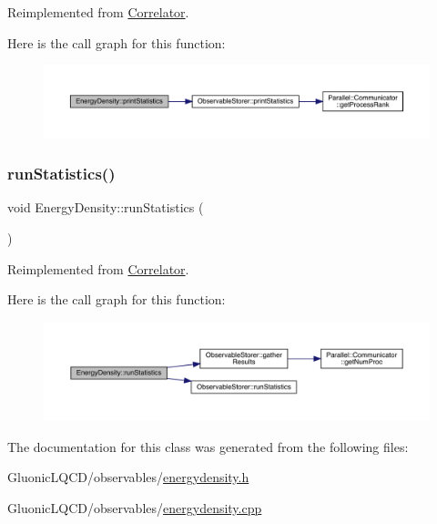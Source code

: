 Reimplemented from \mbox{\hyperlink{class_correlator_a2168d677f547769784781d2e2aaa53cf}{Correlator}}.

Here is the call graph for this function\+:\nopagebreak
\begin{figure}[H]
\begin{center}
\leavevmode
\includegraphics[width=350pt]{class_energy_density_ad108e32bc670f17f15b4ed433d8bbec7_cgraph}
\end{center}
\end{figure}
\mbox{\label{class_energy_density_a584e164453ce880a45478c9b48ce2c4b}} 
\subsubsection{\texorpdfstring{runStatistics()}{runStatistics()}}
{\footnotesize\ttfamily void Energy\+Density\+::run\+Statistics (\begin{DoxyParamCaption}{ }\end{DoxyParamCaption})\hspace{0.3cm}{\ttfamily [virtual]}}



Reimplemented from \mbox{\hyperlink{class_correlator_a35197b1d12b62ef30b79c0138a26456e}{Correlator}}.

Here is the call graph for this function\+:\nopagebreak
\begin{figure}[H]
\begin{center}
\leavevmode
\includegraphics[width=350pt]{class_energy_density_a584e164453ce880a45478c9b48ce2c4b_cgraph}
\end{center}
\end{figure}


The documentation for this class was generated from the following files\+:\begin{DoxyCompactItemize}
\item 
Gluonic\+L\+Q\+C\+D/observables/\mbox{\hyperlink{energydensity_8h}{energydensity.\+h}}\item 
Gluonic\+L\+Q\+C\+D/observables/\mbox{\hyperlink{energydensity_8cpp}{energydensity.\+cpp}}\end{DoxyCompactItemize}

